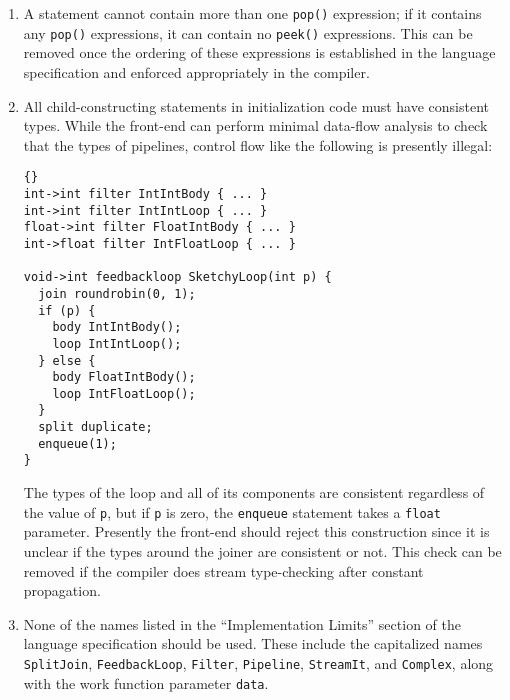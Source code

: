 \documentclass[11pt]{article}
\begin{document}
\begin{enumerate}
\item A statement cannot contain more than one \lstinline|pop()|
  expression; if it contains any \lstinline|pop()| expressions, it can
  contain no \lstinline|peek()| expressions.  This can be removed once
  the ordering of these expressions is established in the language
  specification and enforced appropriately in the compiler.
\item All child-constructing statements in initialization code must
  have consistent types.  While the front-end can perform minimal
  data-flow analysis to check that the types of pipelines, control
  flow like the following is presently illegal:

\begin{lstlisting}{}
int->int filter IntIntBody { ... }
int->int filter IntIntLoop { ... }
float->int filter FloatIntBody { ... }
int->float filter IntFloatLoop { ... }

void->int feedbackloop SketchyLoop(int p) {
  join roundrobin(0, 1);
  if (p) {
    body IntIntBody();
    loop IntIntLoop();
  } else {
    body FloatIntBody();
    loop IntFloatLoop();
  }
  split duplicate;
  enqueue(1);
}
\end{lstlisting}

  The types of the loop and all of its components are consistent
  regardless of the value of \lstinline|p|, but if \lstinline|p| is
  zero, the \lstinline|enqueue| statement takes a \lstinline|float|
  parameter.  Presently the front-end should reject this construction
  since it is unclear if the types around the joiner are consistent or
  not.  This check can be removed if the compiler does stream
  type-checking after constant propagation.
\item None of the names listed in the ``Implementation Limits''
  section of the language specification should be used.  These include
  the capitalized names \lstinline|SplitJoin|,
  \lstinline|FeedbackLoop|, \lstinline|Filter|, \lstinline|Pipeline|,
  \lstinline|StreamIt|, and \lstinline|Complex|, along with the work
  function parameter \lstinline|data|.
\end{enumerate}
\end{document}
